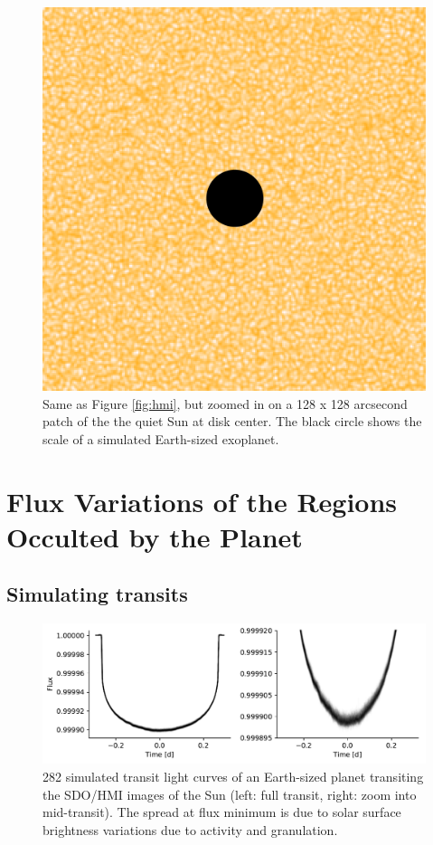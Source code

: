 \begin{figure}
    \centering
    \includegraphics[scale=2.475]{stash/continuum_partial.png}
    \caption{Same as Figure \ref{fig:hmi}, but zoomed in on a 128 x 128 arcsecond patch of the the quiet Sun at disk center. The black circle shows the scale of a simulated Earth-sized exoplanet.}
    \label{fig:hmi2}
\end{figure}

\section{Flux Variations of the Regions Occulted by the Planet} \label{sec:sdohmi}

\subsection{Simulating transits}

\begin{figure}
    \centering
    \includegraphics[scale=0.9]{stash/lc.pdf}
    \caption{282 simulated transit light curves of an Earth-sized planet transiting the SDO/HMI images of the Sun (left: full transit, right: zoom into mid-transit). The spread at flux minimum is due to solar surface brightness variations due to activity and granulation.}
    \label{fig:lc}
\end{figure}

